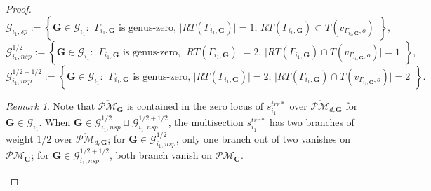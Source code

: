 \documentclass[11pt]{amsart}
\theoremstyle{definition}
\theoremstyle{remark}
\newtheorem{rmk}[dummy]{Remark}
\newcommand{\oPMb}{{\overline{\mathcal{PM}}}}
\newcommand{\nontilde}{}
\newcommand{\<}{\left<}
\renewcommand{\>}{\right>}
\numberwithin{equation}{section}
\begin{document}
\begin{proof}
     \begin{equation*}
             \bm{\mathcal G}^{}_{i_1,sp}:=\left\{ \bm{G}\in \bm{\mathcal G}_{i_1} \colon  \begin{array}{c} \text{$\Gamma_{i_1,\bm{G}}$ is genus-zero, $\lvert RT(\Gamma_{i_1,\bm{G}})\rvert=1$, $RT(\Gamma_{i_1,\bm{G}}) \subset T(v_{\Gamma_{i_1,\bm{G}},o})$}
             \end{array}\right\},
        \end{equation*}
        \begin{equation*}
             \bm{\mathcal G}^{1/2}_{i_1,nsp}:=\left\{ \bm{G}\in \bm{\mathcal G}_{i_1} \colon  \begin{array}{c} \text{$\Gamma_{i_1,\bm{G}}$ is genus-zero, $\lvert RT(\Gamma_{i_1,\bm{G}})\rvert=2$, $\lvert RT(\Gamma_{i_1,\bm{G}}) \cap T(v_{\Gamma_{i_1,\bm{G}},o})\rvert=1$}
             \end{array}\right\},
        \end{equation*}
        \begin{equation*}
             \bm{\mathcal G}^{1/2+1/2}_{i_1,nsp}:=\left\{ \bm{G}\in \bm{\mathcal G}_{i_1} \colon  \begin{array}{c} \text{$\Gamma_{i_1,\bm{G}}$ is genus-zero, $\lvert RT(\Gamma_{i_1,\bm{G}})\rvert=2$, $\lvert RT(\Gamma_{i_1,\bm{G}}) \cap T(v_{\Gamma_{i_1,\bm{G}},o})\rvert=2$}
             \end{array}\right\}.
        \end{equation*}
        
        \begin{rmk}\label{rmk on zero locus of the single global trr of Lstar}
            Note that $\oPMb_{\bm{G}}$ is contained in the zero locus of  $\nontilde{s}^{trr*}_{i_1}$ over $\oPMb_{d_e\bm{G}}$ for $\bm{G}\in \bm{\mathcal G}_{i_1}$. 
             When $\bm{G}\in \bm{\mathcal G}^{1/2}_{i_1,nsp} \sqcup \bm{\mathcal G}^{1/2+1/2}_{i_1,nsp}$, the multisection             $\nontilde{s}^{trr*}_{i_1}$  has two branches of weight $1/2$ over $\oPMb_{d_e\bm{G}}$; for $\bm{G}\in \bm{\mathcal G}^{1/2}_{i_1,nsp}$, only one branch out of two vanishes on $\oPMb_{\bm{G}}$; for $\bm{G}\in  \bm{\mathcal G}^{1/2+1/2}_{i_1,nsp}$, both branch vanish on $\oPMb_{\bm{G}}$. 
        \end{rmk}


\end{proof}
\end{document}
